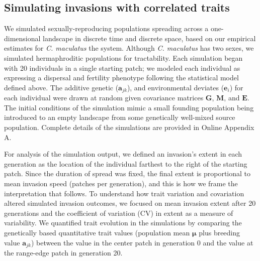 \documentclass[11pt]{article}
\newcommand{\tom}[1]{{\textit{\color{WildStrawberry}{[#1]}}}}
\newcommand{\revise}[1]{{\color{Mahogany}{#1}}}
\begin{document}
\subsection*{Simulating invasions with correlated traits}
We simulated sexually-reproducing populations spreading across a one-dimensional landscape in discrete time and discrete space, based on our empirical estimates for \textit{C. maculatus} the system.
Although \textit{C. maculatus} has two sexes, we simulated hermaphroditic populations for tractability.
Each simulation began with 20 individuals in a single starting patch; we modeled each individual as expressing a dispersal and fertility phenotype following the statistical model defined above.
The additive genetic ($\bm{a}_{jk}$), \revise{maternal ($\bm{m}_{k}$),} and environmental deviates ($\bm{e}_i$) for each individual were drawn at random given covariance matrices $\bm{G}$, $\bm{M}$, and $\bm{E}$.
The initial conditions of the simulation mimic a small founding population being introduced to an empty landscape from some genetically well-mixed source population.
Complete details of the simulations are provided in Online Appendix A.

For analysis of the simulation output, we defined an invasion's extent in each generation as the location of the individual farthest to the right of the starting patch.
Since the duration of spread was fixed, the final extent is proportional to mean invasion speed (patches per generation), and this is how we frame the interpretation that follows.
To understand how trait variation and covariation altered simulated invasion outcomes, we focused on mean invasion extent after 20 generations and the coefficient of variation (CV) in extent as a measure of variability.
We quantified trait evolution in the simulations by comparing the genetically based quantitative trait values (population mean $\bm{\mu}$ plus breeding value $\bm{a}_{jk}$) between the value in the center patch in generation 0 and the value at the range-edge patch in generation 20.
\end{document}
